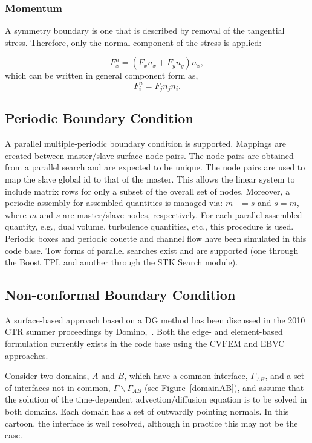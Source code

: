 \subsubsection{Momentum}
A symmetry boundary is one that is described by removal of the tangential stress. Therefore, only
the normal component of the stress is applied:

\begin{equation}
  F^n_x = (F_x n_x + F_y n_y ) n_x,
\end{equation}
which can be written in general component form as,
\begin{equation}
  F^n_i = F_j n_j n_i.
\end{equation}

\subsection{Periodic Boundary Condition}
A parallel multiple-periodic boundary condition is supported. Mappings are created between
master/slave surface node pairs. The node pairs are obtained from a parallel search and are expected
to be unique. The node pairs are used to map the slave global id to that of the master. This allows the linear
system to include matrix rows for only a subset of the overall set of nodes. Moreover, a periodic 
assembly for assembled quantities is managed via: $m+=s$ and $s=m$, where $m$ and $s$ are master/slave nodes, 
respectively. For each parallel assembled quantity, e.g., dual volume, turbulence quantities, etc., this procedure
is used. Periodic boxes and periodic couette and channel flow have been simulated in this code base. Tow forms of
parallel searches exist and are supported (one through the Boost TPL and another through the STK Search module).

\subsection{Non-conformal Boundary Condition}
A surface-based approach based on a DG method has been discussed in the 2010 CTR summer 
proceedings by Domino,~\cite{Domino:2010}. Both the edge- and element-based formulation 
currently exists in the code base using the CVFEM and EBVC approaches. 

Consider two domains, $A$ and $B$, which have a common interface, $\Gamma_{AB}$,
and a set of interfaces not in common, $\Gamma \backslash \Gamma_{AB}$
(see Figure~\ref{domainAB}), and assume that the solution of the 
time-dependent advection/diffusion equation is to be solved in both domains. 
Each domain has a set of outwardly pointing normals. In this cartoon, the interface 
is well resolved, although in practice this may not be the case. 


